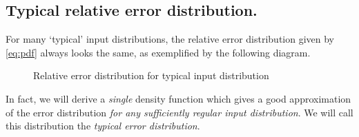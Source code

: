 \documentclass[10pt,a4paper]{article}
\theoremstyle{plain}
\theoremstyle{definition}
\begin{document}
\subsection{Typical relative error distribution.}

For many `typical' input distributions, the relative error distribution given by \eqref{eq:pdf}  always looks the same, as exemplified by the following diagram.

\begin{figure}
\caption{Relative error distribution for typical input distribution}
\label{fig:errdist}
\end{figure}

In fact, we will derive a \emph{single} density function which gives a good approximation of the error distribution \emph{for any sufficiently regular input distribution}. We will call this distribution the \emph{typical error distribution}.
\end{document}

